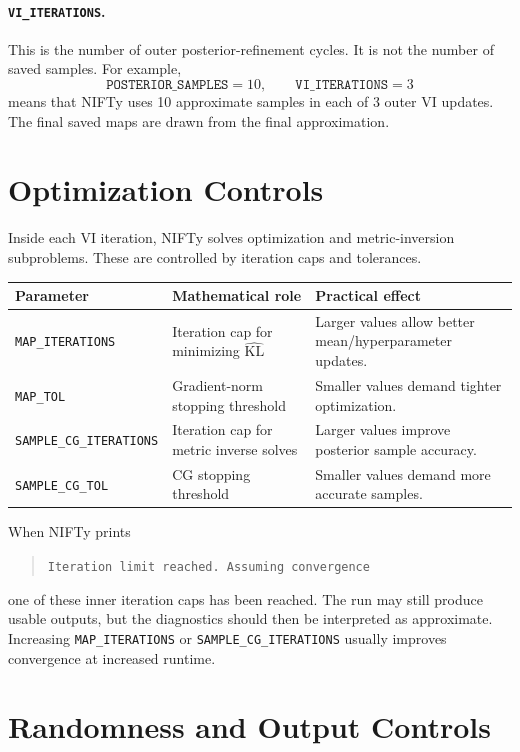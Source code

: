 \documentclass[11pt]{article}
\begin{document}
\paragraph{\texttt{VI\_ITERATIONS}.}
This is the number of outer posterior-refinement cycles.  It is not the number
of saved samples.  For example,
\[
    \texttt{POSTERIOR\_SAMPLES}=10,
    \qquad
    \texttt{VI\_ITERATIONS}=3
\]
means that NIFTy uses 10 approximate samples in each of 3 outer VI updates.
The final saved maps are drawn from the final approximation.

\section{Optimization Controls}

Inside each VI iteration, NIFTy solves optimization and metric-inversion
subproblems.  These are controlled by iteration caps and tolerances.

\begin{center}
\small
\begin{tabularx}{\textwidth}{lXX}
\toprule
Parameter & Mathematical role & Practical effect \\
\midrule
\texttt{MAP\_ITERATIONS}
& Iteration cap for minimizing $\widehat{\mathrm{KL}}$
& Larger values allow better mean/hyperparameter updates. \\
\texttt{MAP\_TOL}
& Gradient-norm stopping threshold
& Smaller values demand tighter optimization. \\
\texttt{SAMPLE\_CG\_ITERATIONS}
& Iteration cap for metric inverse solves
& Larger values improve posterior sample accuracy. \\
\texttt{SAMPLE\_CG\_TOL}
& CG stopping threshold
& Smaller values demand more accurate samples. \\
\bottomrule
\end{tabularx}
\end{center}

When NIFTy prints
\begin{quote}
\texttt{Iteration limit reached. Assuming convergence}
\end{quote}
one of these inner iteration caps has been reached.  The run may still produce
usable outputs, but the diagnostics should then be interpreted as approximate.
Increasing \texttt{MAP\_ITERATIONS} or \texttt{SAMPLE\_CG\_ITERATIONS} usually
improves convergence at increased runtime.

\section{Randomness and Output Controls}
\end{document}

